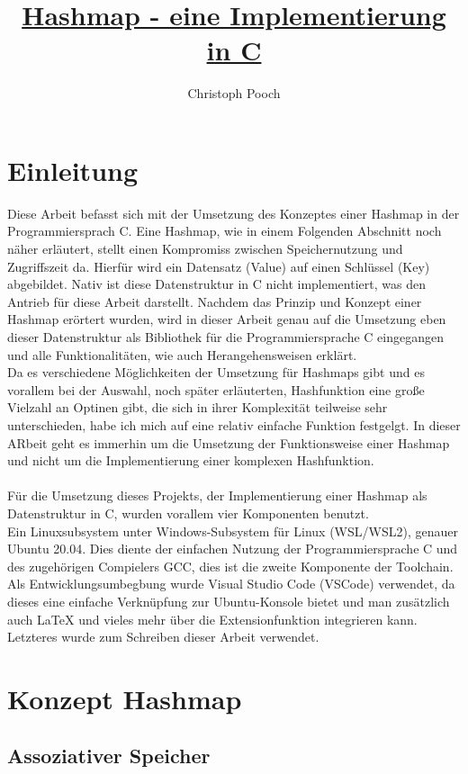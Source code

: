 \documentclass[11pt,a4paper]{article}
\author{Christoph Pooch}
\title{\underline{Hashmap - eine Implementierung in C}}
\begin{document}
\maketitle
\section{Einleitung}
Diese Arbeit befasst sich mit der Umsetzung des Konzeptes einer Hashmap in der Programmiersprach C.
Eine Hashmap, wie in einem Folgenden Abschnitt noch näher erläutert, stellt einen Kompromiss zwischen 
Speichernutzung und Zugriffszeit da.
Hierfür wird ein Datensatz (Value) auf einen Schlüssel (Key) abgebildet.
Nativ ist diese Datenstruktur in C nicht implementiert, was den Antrieb für diese Arbeit darstellt.
Nachdem das Prinzip und Konzept einer Hashmap erörtert wurden, wird in dieser Arbeit genau auf die Umsetzung 
eben dieser Datenstruktur als Bibliothek für die Programmiersprache C eingegangen und alle Funktionalitäten, 
wie auch Herangehensweisen erklärt.\\
Da es verschiedene Möglichkeiten der Umsetzung für Hashmaps gibt und es vorallem bei der Auswahl, noch 
später erläuterten, Hashfunktion eine große Vielzahl an Optinen gibt, die sich in ihrer Komplexität teilweise 
sehr unterschieden, habe ich mich auf eine relativ einfache Funktion festgelgt. %
In dieser ARbeit geht es immerhin um die Umsetzung der Funktionsweise einer Hashmap und nicht um die Implementierung 
einer komplexen Hashfunktion.\\\\ 
Für die Umsetzung dieses Projekts, der Implementierung einer Hashmap als Datenstruktur in C, wurden vorallem vier
Komponenten benutzt.\\
Ein Linuxsubsystem unter Windows-Subsystem für Linux (WSL/WSL2),
genauer Ubuntu 20.04. Dies diente der einfachen Nutzung der Programmiersprache C und des zugehörigen Compielers GCC, 
dies ist die zweite Komponente der Toolchain.\\
Als Entwicklungsumbegbung wurde Visual Studio Code (VSCode) verwendet, da dieses eine einfache Verknüpfung zur 
Ubuntu-Konsole bietet und man zusätzlich auch LaTeX und vieles mehr über die Extensionfunktion integrieren kann.
Letzteres wurde zum Schreiben dieser Arbeit verwendet.

\section{Konzept Hashmap}
\subsection{Assoziativer Speicher}
\end{document}
